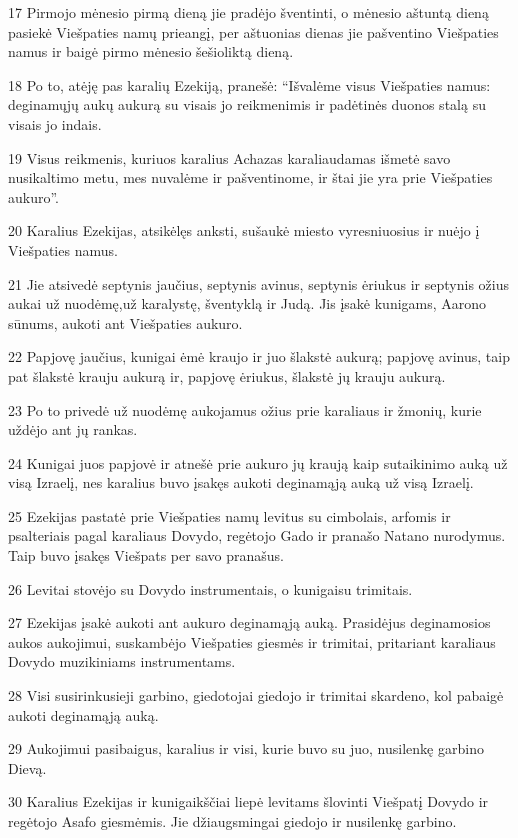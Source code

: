 \par 17 Pirmojo mėnesio pirmą dieną jie pradėjo šventinti, o mėnesio aštuntą dieną pasiekė Viešpaties namų prieangį, per aštuonias dienas jie pašventino Viešpaties namus ir baigė pirmo mėnesio šešioliktą dieną. 
\par 18 Po to, atėję pas karalių Ezekiją, pranešė: “Išvalėme visus Viešpaties namus: deginamųjų aukų aukurą su visais jo reikmenimis ir padėtinės duonos stalą su visais jo indais. 
\par 19 Visus reikmenis, kuriuos karalius Achazas karaliaudamas išmetė savo nusikaltimo metu, mes nuvalėme ir pašventinome, ir štai jie yra prie Viešpaties aukuro”. 
\par 20 Karalius Ezekijas, atsikėlęs anksti, sušaukė miesto vyresniuosius ir nuėjo į Viešpaties namus. 
\par 21 Jie atsivedė septynis jaučius, septynis avinus, septynis ėriukus ir septynis ožius aukai už nuodėmę,­už karalystę, šventyklą ir Judą. Jis įsakė kunigams, Aarono sūnums, aukoti ant Viešpaties aukuro. 
\par 22 Papjovę jaučius, kunigai ėmė kraujo ir juo šlakstė aukurą; papjovę avinus, taip pat šlakstė krauju aukurą ir, papjovę ėriukus, šlakstė jų krauju aukurą. 
\par 23 Po to privedė už nuodėmę aukojamus ožius prie karaliaus ir žmonių, kurie uždėjo ant jų rankas. 
\par 24 Kunigai juos papjovė ir atnešė prie aukuro jų kraują kaip sutaikinimo auką už visą Izraelį, nes karalius buvo įsakęs aukoti deginamąją auką už visą Izraelį. 
\par 25 Ezekijas pastatė prie Viešpaties namų levitus su cimbolais, arfomis ir psalteriais pagal karaliaus Dovydo, regėtojo Gado ir pranašo Natano nurodymus. Taip buvo įsakęs Viešpats per savo pranašus. 
\par 26 Levitai stovėjo su Dovydo instrumentais, o kunigai­su trimitais. 
\par 27 Ezekijas įsakė aukoti ant aukuro deginamąją auką. Prasidėjus deginamosios aukos aukojimui, suskambėjo Viešpaties giesmės ir trimitai, pritariant karaliaus Dovydo muzikiniams instrumentams. 
\par 28 Visi susirinkusieji garbino, giedotojai giedojo ir trimitai skardeno, kol pabaigė aukoti deginamąją auką. 
\par 29 Aukojimui pasibaigus, karalius ir visi, kurie buvo su juo, nusilenkę garbino Dievą. 
\par 30 Karalius Ezekijas ir kunigaikščiai liepė levitams šlovinti Viešpatį Dovydo ir regėtojo Asafo giesmėmis. Jie džiaugsmingai giedojo ir nusilenkę garbino. 
